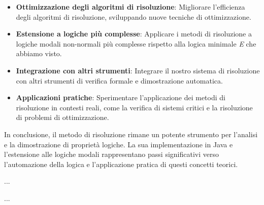 \documentclass[a4paper,12pt]{report}
\begin{document}
\begin{itemize}
    \item \textbf{Ottimizzazione degli algoritmi di risoluzione}: Migliorare l'efficienza degli algoritmi di risoluzione, sviluppando nuove tecniche di ottimizzazione.
    \item \textbf{Estensione a logiche più complesse}: Applicare i metodi di risoluzione a logiche modali non-normali più complesse rispetto alla logica minimale \emph{E} che abbiamo visto.
    \item \textbf{Integrazione con altri strumenti}: Integrare il nostro sistema di risoluzione con altri strumenti di verifica formale e dimostrazione automatica.
    \item \textbf{Applicazioni pratiche}: Sperimentare l'applicazione dei metodi di risoluzione in contesti reali, come la verifica di sistemi critici e la risoluzione di problemi di ottimizzazione.
\end{itemize}
In conclusione, il metodo di risoluzione rimane un potente strumento per l'analisi e la dimostrazione di proprietà logiche. La sua implementazione in Java e l'estensione alle logiche modali rappresentano passi significativi verso l'automazione della logica e l'applicazione pratica di questi concetti teorici.



















%
%
\begin{thebibliography}{00}



%
...
%
%
\end{thebibliography}
% 

%
%
...
\end{document}

